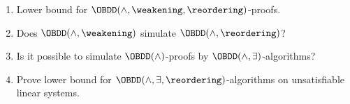 \begin{frame}
	\begin{enumerate}
        \item Lower bound for $\OBDD(\land, \weakening, \reordering)$-proofs.
        \item Does $\OBDD(\land, \weakening)$ simulate $\OBDD(\land, \reordering)$?
        \item Is it possible to simulate $\OBDD(\land)$-proofs by $\OBDD(\land, \exists)$-algorithms?
        \item Prove lower bound for $\OBDD(\land, \exists, \reordering)$-algorithms on unsatisfiable
            linear systems.
    \end{enumerate}    
\end{frame}
